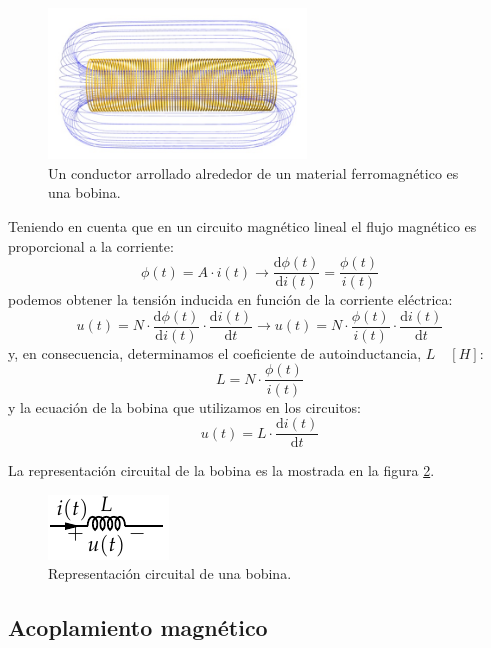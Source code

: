 \begin{figure}[H]
  \centering
  \begin{center}
    \includegraphics[height=4cm]{../figs/Solenoide.jpg}
  \end{center}
  \caption{Un conductor arrollado alrededor de un material ferromagnético es una bobina.}
  \label{fig:solenoide}
\end{figure}
Teniendo en cuenta que en un circuito magnético lineal el flujo magnético es proporcional a la corriente:
\[
  \phi(t) = A \cdot i(t) \rightarrow   \frac{\mathrm{d}\phi(t)}{\mathrm{d} i(t)} = \frac{\phi(t)}{i(t)}
\]
podemos obtener la tensión inducida en función de la corriente eléctrica:
\[
u(t) = N \cdot \frac{\mathrm{d}\phi(t)}{\mathrm{d} i(t)} \cdot  \frac{\mathrm{d}i(t)}{\mathrm{d} t} \rightarrow u(t) = N \cdot \frac{\phi(t)}{i(t)} \cdot \frac{\mathrm{d}i(t)}{\mathrm{d} t}
\]
y, en consecuencia, determinamos el coeficiente de autoinductancia, $L \quad [H]$:
\[
  \boxed{L = N \cdot \frac{\phi(t)}{i(t)}}
\]
y la ecuación de la bobina que utilizamos en los circuitos:
\begin{equation}
  \label{eq:bobina-VI}
  \boxed{u(t) = L \cdot \frac{\mathrm{d}i(t)}{\mathrm{d} t}}
\end{equation}

La representación circuital de la bobina es la mostrada en la figura \ref{fig:bobina-circuito}.
\begin{figure}[H]
  \centering
  \begin{center}
    \includegraphics[height=0.1\textheight]{../figs/Bobina.pdf}
  \end{center}
  \caption{Representación circuital de una bobina.}
  \label{fig:bobina-circuito}
\end{figure}

\subsection{Acoplamiento magnético}
\label{sec:acoplamiento}

